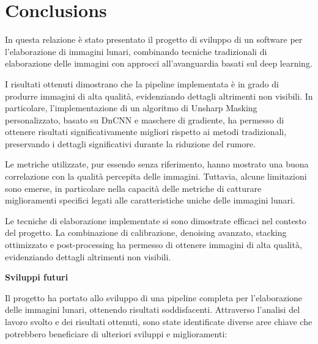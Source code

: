 \chapter*{Conclusions}



In questa relazione è stato presentato il progetto di sviluppo di un software per l'elaborazione di immagini lunari, combinando tecniche tradizionali di elaborazione delle immagini con approcci all'avanguardia basati sul deep learning.

I risultati ottenuti dimostrano che la pipeline implementata è in grado di produrre immagini di alta qualità, evidenziando dettagli altrimenti non visibili. In particolare, l'implementazione di un algoritmo di Unsharp Masking personalizzato, basato su DnCNN e maschere di gradiente, ha permesso di ottenere risultati significativamente migliori rispetto ai metodi tradizionali, preservando i dettagli significativi durante la riduzione del rumore.

Le metriche utilizzate, pur essendo senza riferimento, hanno mostrato una buona correlazione con la qualità percepita delle immagini. Tuttavia, alcune limitazioni sono emerse, in particolare nella capacità delle metriche di catturare miglioramenti specifici legati alle caratteristiche uniche delle immagini lunari.

Le tecniche di elaborazione implementate si sono dimostrate efficaci nel contesto del progetto. La combinazione di calibrazione, denoising avanzato, stacking ottimizzato e post-processing ha permesso di ottenere immagini di alta qualità, evidenziando dettagli altrimenti non visibili.

\textbf{Sviluppi futuri}

Il progetto ha portato allo sviluppo di una pipeline completa per l'elaborazione delle immagini lunari, ottenendo risultati soddisfacenti. Attraverso l'analisi del lavoro svolto e dei risultati ottenuti, sono state identificate diverse aree chiave che potrebbero beneficiare di ulteriori sviluppi e miglioramenti:

